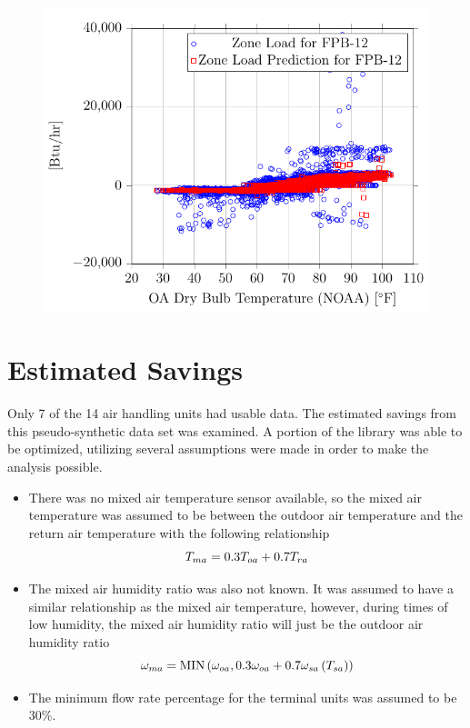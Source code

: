 \begin{figure}
\centering
\includegraphics{Plots/43-PrestonRoyalFPB-12-ZoneLoad/2017-08-07-0928-BtuhrvsOADryBulbTemperatureNOAAF.pdf}
\caption{}
\label{fig:2017-08-07-0928-BtuhrvsOADryBulbTemperatureNOAAF12}
\end{figure}

\section{Estimated Savings}

Only 7 of the 14 air handling units had usable data. The estimated
savings from this pseudo-synthetic data set was examined. A portion of
the library was able to be optimized, utilizing several
assumptions were made in order to make the analysis possible. 

\begin{itemize}
    \item There was no mixed air temperature sensor available, so the
        mixed air temperature was assumed to be between the outdoor air
        temperature and the return air temperature with the following
        relationship
\begin{equation}
T_{ma}{} = 0.3 T_{oa}{} + 0.7 T_{ra}{}
\end{equation}
\item The mixed air humidity ratio was also not known. It was assumed to
    have a similar relationship as the mixed air temperature, however,
    during times of low humidity, the mixed air humidity ratio will just
    be the outdoor air humidity ratio
\begin{equation}
    \omega_{ma} = \text{MIN}\left(\omega_{oa}, 0.3 \omega_{oa} + 0.7
    \omega_{sa}\left(T_{sa}{}\right) \right)
\end{equation}
\item The minimum flow rate percentage for the terminal units was
    assumed to be 30\%. 
\end{itemize}

